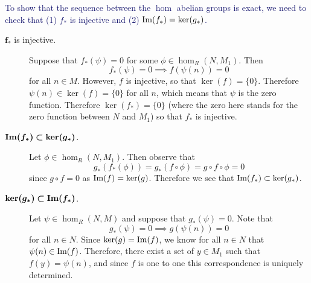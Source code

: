 \begin{prf}
    \textcolor{MidnightBlue}{To show that the sequence between the
    $\hom$ abelian groups is exact, we need to check that (1)
    $f_*$ is injective and (2) $\mbox{Im}(f_*) = \ker(g_*)$.
    }
    \begin{description}
        \item[$\bm{f_*}$ is injective.]
            Suppose that $f_*(\psi) = 0$ for some $\phi \in
            \hom_R(N, M_1)$. Then 
            \[
                f_*(\psi) = 0 \implies f(\psi(n)) = 0
            \] 
            for all $n \in M$. However, $f$ is injective, so that
            $\ker(f) = \{0\}$. Therefore $\psi(n) \in \ker(f) =
            \{0\}$ for all $n$, which means that $\psi$ is the
            zero function. Therefore $\ker(f_*) = \{0\}$ (where
            the zero here stands for the zero function between $N$
            and $M_1$) so that $f_*$ is injective. 

            \item[$\bm{\mbox{Im}(f_*) \subset \ker(g_*)}$.]
            Let $\phi \in \hom_R(N, M_1)$. Then observe that 
            \[
                g_*(f_*(\phi)) = g_*(f \circ \phi) = g \circ f \circ \phi = 0
            \] 
            since $g \circ f = 0$ as $\mbox{Im}(f) =
            \ker(g)$.
            Therefore we see that $\mbox{Im}(f_*) \subset \ker(g_*)$. 
    
            \item[$\bm{\ker(g_*) \subset \mbox{Im}(f_*)}$.]
            Let $\psi \in \hom_R(N, M)$ and suppose that $g_*(\psi)
            = 0$. Note that 
            \[
                g_*(\psi) = 0 \implies g(\psi(n)) = 0
            \]
            for all $n \in N$. Since $\ker(g) = \mbox{Im}(f)$, we know
            for all $n \in N$ that $\psi(n) \in \mbox{Im}(f)$.
            Therefore, there exist a set of $y \in M_1$ such that
            $f(y) = \psi(n)$, and since $f$ is one to one this
            correspondence is uniquely determined. 


\end{description}
\end{prf}
